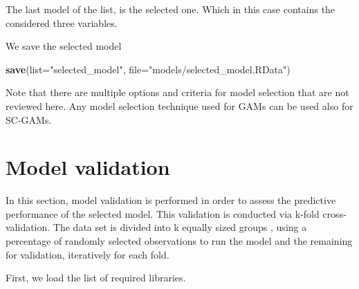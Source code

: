 \documentclass[
]{book}
\newenvironment{Shaded}{\begin{snugshade}}{\end{snugshade}}
\newcommand{\AttributeTok}[1]{\textcolor[rgb]{0.13,0.29,0.53}{#1}}
\newcommand{\FunctionTok}[1]{\textcolor[rgb]{0.13,0.29,0.53}{\textbf{#1}}}
\newcommand{\NormalTok}[1]{#1}
\newcommand{\OtherTok}[1]{\textcolor[rgb]{0.56,0.35,0.01}{#1}}
\newcommand{\SpecialCharTok}[1]{\textcolor[rgb]{0.81,0.36,0.00}{\textbf{#1}}}
\newcommand{\StringTok}[1]{\textcolor[rgb]{0.31,0.60,0.02}{#1}}
\begin{document}
The last model of the list, is the selected one. Which in this case contains the considered three variables.

\begin{Shaded}
\end{Shaded}

We save the selected model

\begin{Shaded}
\begin{Highlighting}[]
\FunctionTok{save}\NormalTok{(}\AttributeTok{list=}\StringTok{"selected\_model"}\NormalTok{, }\AttributeTok{file=}\StringTok{"models/selected\_model.RData"}\NormalTok{)}
\end{Highlighting}
\end{Shaded}

Note that there are multiple options and criteria for model selection that are not reviewed here. Any model selection technique used for GAMs can be used also for SC-GAMs.

\chapter{Model validation}\label{model-validation}

In this section, model validation is performed in order to assess the predictive performance of the selected model. This validation is conducted via k-fold cross-validation. The data set is divided into k equally sized groups \citep{hijmans_2012}, using a percentage of randomly selected observations to run the model and the remaining for validation, iteratively for each fold.

First, we load the list of required libraries.
\end{document}
